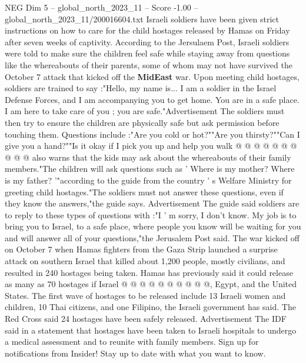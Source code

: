 \begin{textsample}{NEG Dim 5 – global\_north\_2023\_11 – Score -1.00 – global\_north\_2023\_11/200016604.txt}  \label{ex:f5_neg_041}
Israeli soldiers have been given strict instructions on how to care for the child hostages released by Hamas on Friday after seven weeks of captivity.
According to the Jersulaem Post, Israeli soldiers were told to make sure the children feel safe while staying away from questions like the whereabouts of their parents, some of whom may not have survived the October 7 attack that kicked off the \textbf{MidEast} war.
Upon meeting child hostages, soldiers are trained to say :"Hello, my name is...
I am a soldier in the Israel Defense Forces, and I am accompanying you to get home.
You are in a safe place.
I am here to take care of you ; you are safe."Advertisement The soldiers must then try to ensure the children are physically safe but ask permission before touching them.
Questions include :"Are you cold or hot?""Are you thirsty?""Can I give you a hand?""Is it okay if I pick you up and help you walk @ @ @ @ @ @ @ @ @ @ also warns that the kids may ask about the whereabouts of their family members."The children will ask questions such as ' Where is my mother?
Where is my father? '"according to the guide from the country ' s Welfare Ministry for greeting child hostages."The soldiers must not answer these questions, even if they know the answers,"the guide says.
Advertisement The guide said soldiers are to reply to these types of questions with :"I ' m sorry, I don't know.
My job is to bring you to Israel, to a safe place, where people you know will be waiting for you and will answer all of your questions,"the Jerusalem Post said.
The war kicked off on October 7 when Hamas fighters from the Gaza Strip launched a surprise attack on southern Israel that killed about 1,200 people, mostly civilians, and resulted in 240 hostages being taken.
Hamas has previously said it could release as many as 70 hostages if Israel @ @ @ @ @ @ @ @ @ @, Egypt, and the United States.
The first wave of hostages to be released include 13 Israeli women and children, 10 Thai citizens, and one Filipino, the Israeli government has said.
The Red Cross said 24 hostages have been safely released.
Advertisement The IDF said in a statement that hostages have been taken to Israeli hospitals to undergo a medical assessment and to reunite with family members.
Sign up for notifications from Insider!
Stay up to date with what you want to know.

\end{textsample}
